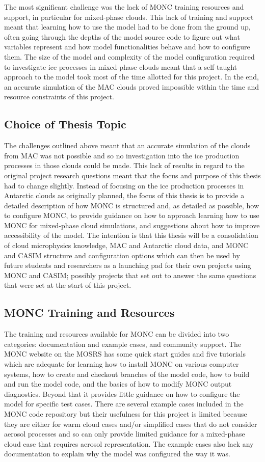 The most significant challenge was the lack of MONC training resources and support, in particular for mixed-phase clouds. This lack of training and support meant that learning how to use the model had to be done from the ground up, often going through the depths of the model source code to figure out what variables represent and how model functionalities behave and how to configure them. The size of the model and complexity of the model configuration required to investigate ice processes in mixed-phase clouds meant that a self-taught approach to the model took most of the time allotted for this project. In the end, an accurate simulation of the MAC clouds proved impossible within the time and resource constraints of this project. 

\subsection{Choice of Thesis Topic}
The challenges outlined above meant that an accurate simulation of the clouds from MAC was not possible and so no investigation into the ice production processes in those clouds could be made. This lack of results in regard to the original project research questions meant that the focus and purpose of this thesis had to change slightly. Instead of focusing on the ice production processes in Antarctic clouds as originally planned, the focus of this thesis is to provide a detailed description of how MONC is structured and, as detailed as possible, how to configure MONC, to provide guidance on how to approach learning how to use MONC for mixed-phase cloud simulations, and suggestions about how to improve accessibility of the model. The intention is that this thesis will be a consolidation of cloud microphysics knowledge, MAC and Antarctic cloud data, and MONC and CASIM structure and configuration options which can then be used by future students and researchers as a launching pad for their own projects using MONC and CASIM; possibly projects that set out to answer the same questions that were set at the start of this project.

\subsection{MONC Training and Resources}
The training and resources available for MONC can be divided into two categories: documentation and example cases, and community support. The MONC website on the MOSRS has some quick start guides and five tutorials \citep{moncGuides} which are adequate for learning how to install MONC on various computer systems, how to create and checkout branches of the model code, how to build and run the model code, and the basics of how to modify MONC output diagnostics. Beyond that it provides little guidance on how to configure the model for specific test cases. There are several example cases included in the MONC code repository but their usefulness for this project is limited because they are either for warm cloud cases and/or simplified cases that do not consider aerosol processes and so can only provide limited guidance for a mixed-phase cloud case that requires aerosol representation. The example cases also lack any documentation to explain why the model was configured the way it was. 

